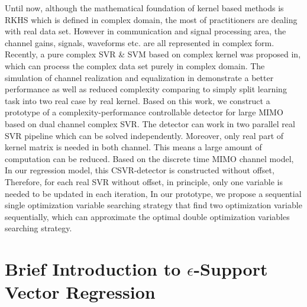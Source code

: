 \documentclass[12pt, draftclsnofoot, onecolumn]{IEEEtran}
\begin{document}
\begin{spacing}{2}
Until now, although the mathematical foundation of kernel based methods is RKHS which is defined in complex domain, the most of practitioners are dealing with real data set. However in communication and signal processing area, the channel gains, signals, waveforms etc. are all represented in complex form. Recently, a pure complex SVR \& SVM based on complex kernel was proposed in\cite{bouboulis2013complex}, which can process the complex data set purely in complex domain. The simulation of channel realization and equalization in\cite{bouboulis2013complex} demonstrate a better performance as well as reduced complexity comparing to simply split learning task into two real case by real kernel.  
Based on this work, we construct a prototype of a complexity-performance controllable detector for large MIMO based on dual channel complex SVR. The detector can work in two parallel real SVR pipeline which can be solved independently. Moreover, only real part of kernel matrix is needed in both channel. This means a large amount of computation can be reduced.
Based on the discrete time MIMO channel model, In our regression model, this CSVR-detector
is constructed without offset, Therefore, for each real SVR without offset, in principle, only one variable is needed to be updated in each iteration, In our prototype, we propose a sequential single optimization variable searching strategy that find two optimization variable sequentially, which can approximate the optimal double optimization variables searching strategy. 
  



\section{Brief Introduction to $\epsilon$-Support Vector Regression}\label{Introduce epsilon SVR}

\end{spacing}
\end{document}
